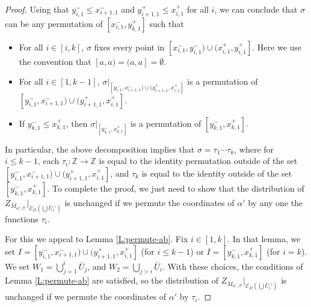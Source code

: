 \documentclass[aop, preprint]{imsart}
\theoremstyle{plain}
\theoremstyle{definition}
\theoremstyle{plain}
\newcommand{\al}{\alpha}
\newcommand{\be}{\beta}
\newcommand{\sig}{\sigma}
\newcommand{\scrE}{\mathcal{E}}
\newcommand{\scrH}{\mathcal{H}}
\newcommand{\Z}{\mathds{Z}}
\newcommand{\X}{\times}
\newcommand{\smin}{\setminus}
\begin{document}
\begin{proof}
	 Using that $y_{i, 1}^- \le x_{i+1, 1}^-$ and $y_{i + 1, 1}^+ \le x_{i, 1}^+$ for all $i$, we can conclude that $\sig$ can be any permutation of
	 $[x_{i,1}^-, y_{k,1}^+]$ such that
	 \begin{itemize}
	 	\item For all $i \in [i, k]$, $\sig$ fixes every point in $[x_{i,1}^-, y_{i,1}^-) \cup (x_{i,1}^+, y_{i,1}^+]$. Here we use the convention that $[a, a) = (a, a] = \emptyset$.
	 	\item For all $i \in [1, k - 1]$, $\sig|_{[y_{i, 1}^-, x_{i+1, 1}^-) \cup (y_{i + 1, 1}^+, x_{i, 1}^+]}$ is a permutation of $[y_{i, 1}^-, x_{i+1, 1}^-) \cup (y_{i + 1, 1}^+, x_{i, 1}^+]$.
	 		\item If $y_{k, 1}^- \le x_{k, 1}^+$, then $\sig|_{[y_{k, 1}^-, x_{k, 1}^+]}$ is a permutation of $[y_{k, 1}^-, x_{k, 1}^+]$.
	 \end{itemize}
 In particular, the above decomposition implies that $\sig = \tau_1 \cdots \tau_k$, where for $i \le k-1$, each $\tau_i:\Z \to \Z$ is equal to the identity permutation outside of the set $[y_{i, 1}^-, x_{i+1, 1}^-) \cup (y_{i + 1, 1}^+, x_{i, 1}^+]$, and $\tau_k$ is equal to the identity outside of the set $[y_{k, 1}^-, x_{k, 1}^+]$. To complete the proof, we just need to show that the distribution of $Z_{M_{\al', \be'}}|_{\scrE_D(\bigcup \bar U_i')}$ is unchanged if we permute the coordinates of $\al'$ by any one the functions $\tau_i$. 
 
 For this we appeal to Lemma \ref{L:permute-ab}. Fix $i \in [1, k]$. In that lemma, we set $I = [y_{i, 1}^-, x_{i+1, 1}^-) \cup (y_{i + 1, 1}^+, x_{i, 1}^+]$ (for $i \le k -1$) or $I = [y_{k, 1}^-, x_{k, 1}^+]$ (for $i = k$). We set $W_1 = \bigcup_{j=1}^i \bar U_j$, and $W_2 = \bigcup_{j > i} \bar U_i$. With these choices, the conditions of Lemma \ref{L:permute-ab} are satisfied, so the distribution of $Z_{M_{\al', \be'}}|_{\scrE_D(\bigcup \bar U_i')}$ is unchanged if we permute the coordinates of $\al'$ by $\tau_i$.
%  
%	 
%	
%	
%	
\end{proof}
\end{document}
